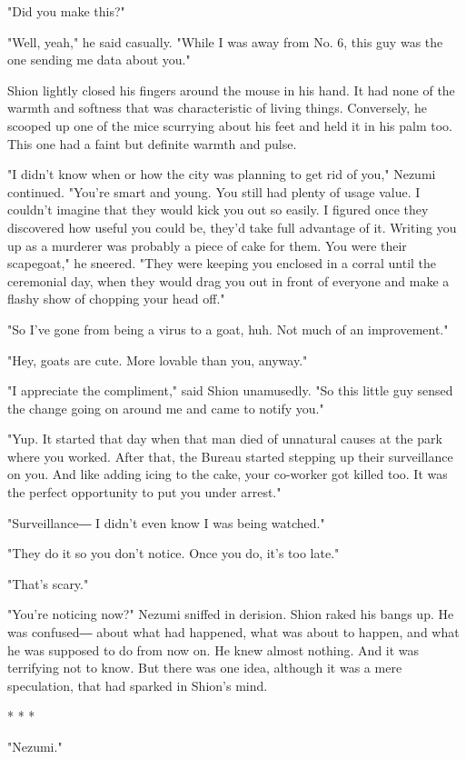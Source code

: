 "Did you make this?"

"Well, yeah," he said casually. "While I was away from No. 6, this guy
was the one sending me data about you."

Shion lightly closed his fingers around the mouse in his hand. It had
none of the warmth and softness that was characteristic of living
things. Conversely, he scooped up one of the mice scurrying about his
feet and held it in his palm too. This one had a faint but definite
warmth and pulse.

"I didn't know when or how the city was planning to get rid of you,"
Nezumi continued. "You're smart and young. You still had plenty of usage
value. I couldn't imagine that they would kick you out so easily. I
figured once they discovered how useful you could be, they'd take full
advantage of it. Writing you up as a murderer was probably a piece of
cake for them. You were their scapegoat," he sneered. "They were keeping
you enclosed in a corral until the ceremonial day, when they would drag
you out in front of everyone and make a flashy show of chopping your
head off."

"So I've gone from being a virus to a goat, huh. Not much of an
improvement."

"Hey, goats are cute. More lovable than you, anyway."

"I appreciate the compliment," said Shion unamusedly. "So this little
guy sensed the change going on around me and came to notify you."

"Yup. It started that day when that man died of unnatural causes at the
park where you worked. After that, the Bureau started stepping up their
surveillance on you. And like adding icing to the cake, your co-worker
got killed too. It was the perfect opportunity to put you under arrest."

"Surveillance― I didn't even know I was being watched."

"They do it so you don't notice. Once you do, it's too late."

"That's scary."

"You're noticing now?" Nezumi sniffed in derision. Shion raked his bangs
up. He was confused― about what had happened, what was about to happen,
and what he was supposed to do from now on. He knew almost nothing. And
it was terrifying not to know. But there was one idea, although it was a
mere speculation, that had sparked in Shion's mind.

* * *

"Nezumi."

